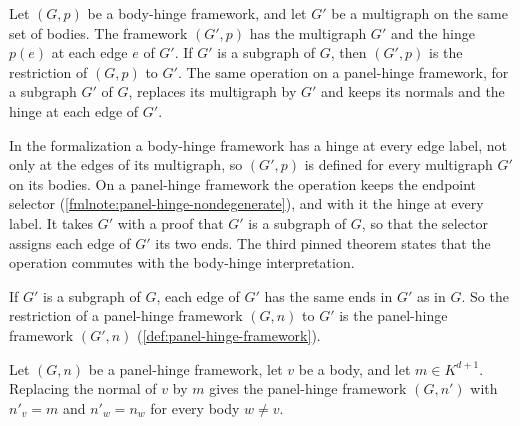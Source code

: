 \begin{definition}
  \label{def:framework-with-graph}
  \leanok
  Let $(G,p)$ be a body-hinge framework, and let $G'$ be a multigraph on
  the same set of bodies. The framework $(G',p)$ has the multigraph $G'$
  and the hinge $p(e)$ at each edge $e$ of $G'$. If $G'$ is a subgraph of
  $G$, then $(G',p)$ is the restriction of $(G,p)$ to $G'$. The same
  operation on a panel-hinge framework, for a subgraph $G'$ of $G$,
  replaces its multigraph by $G'$ and keeps its normals and the hinge at
  each edge of $G'$.
\end{definition}

\begin{fmlnote}
  In the formalization a body-hinge framework has a hinge at every edge
  label, not only at the edges of its multigraph, so $(G',p)$ is defined
  for every multigraph $G'$ on its bodies. On a panel-hinge framework the
  operation keeps the endpoint selector
  (\cref{fmlnote:panel-hinge-nondegenerate}), and with it the hinge at
  every label. It takes $G'$ with a proof that $G'$ is a subgraph of
  $G$, so that the selector assigns each edge of $G'$ its two ends. The
  third pinned theorem states that the operation commutes with the
  body-hinge interpretation.
\end{fmlnote}

If $G'$ is a subgraph of $G$, each edge of $G'$ has the same ends in
$G'$ as in $G$. So the restriction of a panel-hinge framework $(G, n)$
to $G'$ is the panel-hinge framework $(G', n)$
(\cref{def:panel-hinge-framework}).

\begin{definition}
  \label{def:framework-with-normal}
  \leanok
  Let $(G, n)$ be a panel-hinge framework, let $v$ be a body, and let
  $m \in K^{d+1}$. Replacing the normal of $v$ by $m$ gives the
  panel-hinge framework $(G, n')$ with $n'_v = m$ and $n'_w = n_w$ for
  every body $w \neq v$.
\end{definition}

